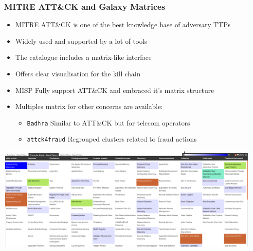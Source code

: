 \begin{frame}
    \frametitle{MITRE ATT\&CK and Galaxy Matrices}
    \begin{itemize}
        \item MITRE ATT\&CK is one of the best knowledge base of adversary TTPs
        \item Widely used and supported by a lot of tools
        \item The catalogue includes a matrix-like interface
        \item Offers clear visualisation for the kill chain
    \end{itemize}
    \begin{itemize}
        \item MISP Fully support ATT\&CK and embraced it's matrix structure
        \item Multiples matrix for other concerns are available:
        \begin{itemize}
            \item \texttt{Badhra} Similar to ATT\&CK but for telecom operators
            \item \texttt{attck4fraud} Regrouped clusters related to fraud actions
        \end{itemize}
    \end{itemize}
    \includegraphics[scale=1.0]{pictures/attack.png}
\end{frame}

